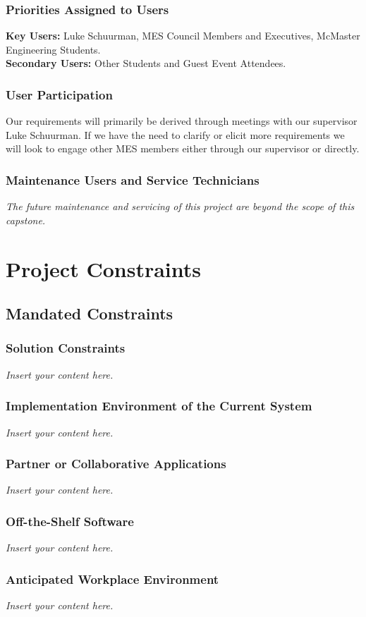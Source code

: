 \documentclass[12pt]{article}
\newcommand{\lips}{\textit{Insert your content here.}}
\begin{document}
\subsubsection{Priorities Assigned to Users}
\textbf{Key Users:} Luke Schuurman, MES Council Members and Executives, McMaster Engineering Students. \\
\textbf{Secondary Users:} Other Students and Guest Event Attendees.
\subsubsection{User Participation}
Our requirements will primarily be derived through meetings with our supervisor Luke Schuurman. If we have the need to clarify or elicit more requirements we will look to engage other MES members either through our supervisor or directly.
\subsubsection{Maintenance Users and Service Technicians}
\textit{The future maintenance and servicing of this project are beyond the scope of this capstone.}
\section{Project Constraints}
\subsection{Mandated Constraints}
\subsubsection{Solution Constraints}
\lips
\subsubsection{Implementation Environment of the Current System}
\lips
\subsubsection{Partner or Collaborative Applications}
\lips
\subsubsection{Off-the-Shelf Software}
\lips
\subsubsection{Anticipated Workplace Environment}
\lips
\end{document}
